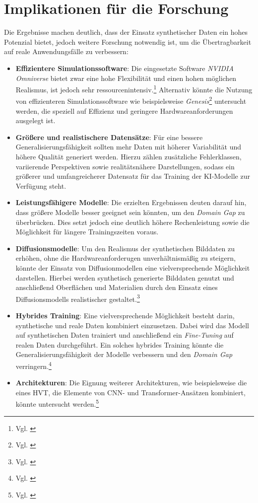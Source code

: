 \section{Implikationen für die Forschung}
Die Ergebnisse machen deutlich, dass der Einsatz synthetischer Daten ein hohes Potenzial bietet, jedoch weitere Forschung notwendig ist, um die Übertragbarkeit auf reale Anwendungsfälle zu verbessern:

\begin{itemize}
    \item \textbf{Effizientere Simulationssoftware}: Die eingesetzte Software \textit{NVIDIA Omniverse} bietet zwar eine hohe Flexibilität und einen hohen möglichen Realismus, ist jedoch sehr ressourcenintensiv.\footnote{Vgl. \cite{noauthor_isaac_nodate}} Alternativ könnte die Nutzung von effizienteren Simulationssoftware wie beispielsweise \textit{Genesis}\footnote{Vgl. \cite{noauthor_genesis-embodied-aigenesis_2025}} untersucht werden, die speziell auf Effizienz und geringere Hardwareanforderungen ausgelegt ist.
    \item \textbf{Größere und realistischere Datensätze}: Für eine bessere Generalisierungsfähigkeit sollten mehr Daten mit höherer Variabilität und höhere Qualität generiert werden. Hierzu zählen zusätzliche Fehlerklassen, variierende Perspektiven sowie realitätsnähere Darstellungen, sodass ein größerer und umfangreicherer Datensatz für das Training der \ac{KI}-Modelle zur Verfügung steht.
    \item \textbf{Leistungsfähigere Modelle}: Die erzielten Ergebnissen deuten darauf hin, dass größere Modelle besser geeignet sein könnten, um den \textit{Domain Gap} zu überbrücken. Dies setzt jedoch eine deutlich höhere Rechenleistung sowie die Möglichkeit für längere Trainingszeiten voraus.
    \item \textbf{Diffusionsmodelle}: Um den Realismus der synthetischen Bilddaten zu erhöhen, ohne die Hardwareanforderugen unverhältnismäßig zu steigern, könnte der Einsatz von Diffusionmodellen eine vielversprechende Möglichkeit darstellen. Hierbei werden synthetisch generierte Bilddaten genutzt und anschließend Oberflächen und Materialien durch den Einsatz eines Diffusionsmodells realistischer gestaltet.\footnote{Vgl. \cite{hadadan_generative_2025}}
    \item \textbf{Hybrides Training}: Eine vielversprechende Möglichkeit besteht darin, synthetische und reale Daten kombiniert einzusetzen. Dabei wird das Modell auf synthetischen Daten trainiert und anschließend ein \textit{Fine-Tuning} auf realen Daten durchgeführt. Ein solches hybrides Training könnte die Generalisierungsfähigkeit der Modelle verbessern und den \textit{Domain Gap} verringern.\footnote{Vgl. \cite[17]{zaripov_creation_2025}}
    \item \textbf{Architekturen}: Die Eignung weiterer Architekturen, wie beispielsweise die eines \ac{HVT}, die Elemente von \ac{CNN}- und Transformer-Ansätzen kombiniert, könnte untersucht werden.\footnote{Vgl. \cite[S. 4 f.]{khan_survey_2023}}
\end{itemize}

